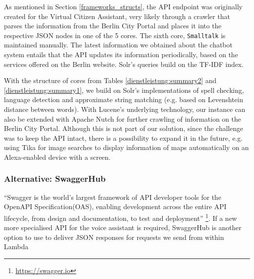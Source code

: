 As mentioned in Section \ref{frameworks_structs}, the API endpoint was originally created for the Virtual Citizen Assistant, very likely through a crawler %
that parses the information from the Berlin City Portal and places it into the respective JSON nodes in one of the 5 cores. The sixth core, \texttt{Smalltalk} is maintained manually. The latest information we obtained about the chatbot system entails that the API updates its information periodically, based on the services offered on the Berlin website. 
Solr's queries build on the TF-IDF index.


With the structure of cores from Tables \ref{dienstleistung:summary2} and \ref{dienstleistung:summary1}, we build on Solr's implementations of spell checking, language detection and approximate string matching (e.g. based on Levenshtein distance between words). With Lucene's underlying technology, our instance can also be extended with Apache Nutch for further crawling of information on the Berlin City Portal. Although this is not part of our solution, since the challenge was to keep the API intact, there is a possibility to expand it in the future, e.g. using Tika for image searches to display information of maps automatically on an Alexa-enabled device with a screen. %




%
%





\subsubsection*{Alternative: SwaggerHub}
 ``Swagger is the world’s largest framework of API developer tools for the OpenAPI Specification(OAS), enabling development across the entire API lifecycle, from design and documentation, to test and deployment'' \footnote{\url{https://swagger.io}}. 
 If a new more specialised API for the voice assistant is required, SwaggerHub is another option to use to deliver JSON responses for requests we send from within Lambda 


